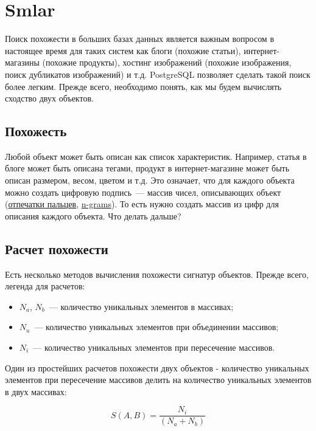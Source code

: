 \section{Smlar}

Поиск похожести в больших базах данных является важным вопросом в настоящее время для таких систем как блоги (похожие статьи), интернет-магазины (похожие продукты), хостинг изображений (похожие изображения, поиск дубликатов изображений) и т.д. PostgreSQL позволяет сделать такой поиск более легким. Прежде всего, необходимо понять, как мы будем вычислять сходство двух объектов.

\subsection{Похожесть}

Любой объект может быть описан как список характеристик. Например, статья в блоге может быть описана тегами, продукт в интернет-магазине может быть описан размером, весом, цветом и т.д. Это означает, что для каждого объекта можно создать цифровую подпись~--- массив чисел, описывающих объект (\href{http://en.wikipedia.org/wiki/Fingerprint}{отпечатки пальцев}, \href{http://en.wikipedia.org/wiki/N-gram}{n-grams}). То есть нужно создать массив из цифр для описания каждого объекта. Что делать дальше?

\subsection{Расчет похожести}

Есть несколько методов вычисления похожести сигнатур объектов. Прежде всего, легенда для расчетов:

\begin{itemize}
  \item $N_a$, $N_b$~--- количество уникальных элементов в массивах;
  \item $N_u$~--- количество уникальных элементов при объединении массивов;
  \item $N_i$~--- количество уникальных элементов при пересечение массивов.
\end{itemize}

Один из простейших расчетов похожести двух объектов - количество уникальных элементов при пересечение массивов делить на количество уникальных элементов в двух массивах:

\begin{equation}
 \label{eq:smlar1}
 S(A,B) = \frac{N_{i}}{(N_{a}+N_{b})}
\end{equation}

